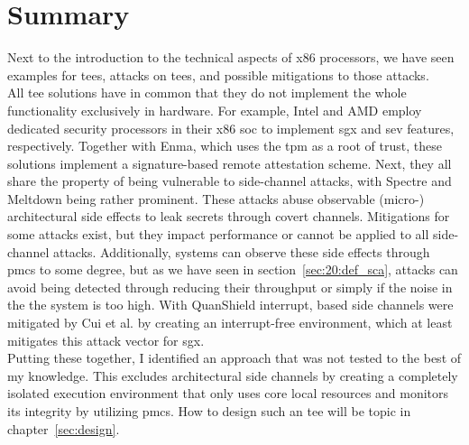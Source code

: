 \section{Summary}
\label{sec:20:summary}
Next to the introduction to the technical aspects of x86 processors, we have seen
examples for \glspl{tee}, attacks on \glspl{tee}, and possible mitigations to
those attacks. \\

All \gls{tee} solutions have in common that they do not implement the whole
functionality exclusively in hardware. For example, Intel and AMD employ
dedicated security processors in their x86 \gls{soc} to implement \gls{sgx} and
\gls{sev} features, respectively. Together with Enma, which uses the \gls{tpm}
as a root of trust, these solutions implement a signature-based remote
attestation scheme. Next, they all share the property of being vulnerable to
side-channel attacks, with Spectre and Meltdown being rather prominent. These
attacks abuse observable (micro-) architectural side effects to leak secrets
through covert channels. Mitigations for some attacks exist, but they impact
performance or cannot be applied to all side-channel attacks. Additionally,
systems can observe these side effects through \glspl{pmc} to some degree, but
as we have seen in section~\ref{sec:20:def_sca}, attacks can avoid being
detected through reducing their throughput or simply if the noise in the the
system is too high. With QuanShield interrupt, based side channels were
mitigated by Cui et al. by creating an interrupt-free environment, which at
least mitigates this attack vector for \gls{sgx}.\\

Putting these together, I identified an approach that was not tested to the best
of my knowledge. This excludes architectural side channels by creating a
completely isolated execution environment that only uses core local resources
and monitors its integrity by utilizing \glspl{pmc}. How to design such an
\gls{tee} will be topic in chapter~\ref{sec:design}.
